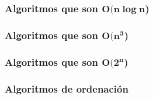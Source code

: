 \documentclass[11pt]{article}
\begin{document}
\begin{center}
	
\end{center}

\begin{center}
	
\end{center}


\subsubsection*{Algoritmos que son $\boldsymbol{O(n\log n}$)}


\begin{center}
	
\end{center}


\begin{center}
	
\end{center}


\begin{center}
	
\end{center}

\begin{center}
	
\end{center}

\subsubsection*{Algoritmos que son $\boldsymbol{O(n^3}$)}

\begin{center}
	
\end{center}


\subsubsection*{Algoritmos que son $\boldsymbol{O(2^n}$)}


\begin{center}
	
\end{center}


\subsubsection*{Algoritmos de ordenación}


\begin{center}
	
\end{center}
\end{document}
